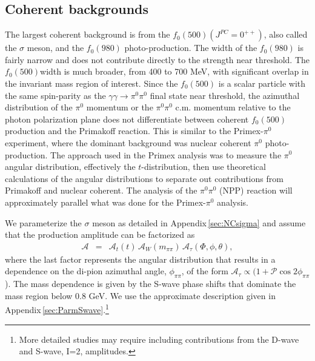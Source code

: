 \subsection{Coherent backgrounds}
   
 The largest coherent background is  
from the $f_0(500)(J^{PC}=0^{++})$, also called the $\sigma$ meson, and the $f_0(980)$ photo-production.  The width of the
$f_0(980)$ is fairly narrow and does not contribute directly to the strength near threshold.
The $f_0(500)$width is much
broader, from 400 to 700 MeV, with significant overlap in the
invariant mass region of interest.  Since the $f_0(500)$ is a scalar
particle with the same spin-parity as the $\gamma \gamma \rightarrow
\pi^0\pi^0$ final state near threshold, the azimuthal distribution of
the $\pi^0$ momentum or the $\pi^0\pi^0$ c.m. momentum relative to the
photon polarization plane does not differentiate between coherent
$f_0(500)$ production and the Primakoff reaction.  
This is similar to the Primex-$\pi^0$ experiment, where the dominant background was
nuclear coherent $\pi^0$ photo-production.  The approach used in the
Primex analysis was to measure the $\pi^0$ angular distribution,
effectively the $t$-distribution, then use theoretical calculations of
the angular distributions to separate out contributions from Primakoff
and nuclear coherent. The analysis of the $\pi^0\pi^0$ (NPP) reaction
will approximately parallel what was done for the Primex-$\pi^0$
analysis.  

We parameterize the $\sigma$ meson as detailed in Appendix\,\ref{sec:NCsigma} and assume that the production amplitude can be factorized as
\begin{eqnarray}
\mathcal{A} & = & \mathcal{A}_t(t) \, \mathcal{A}_W(m_{\pi\pi}) \, \mathcal{A}_\tau(\Phi, \phi, \theta),
\end{eqnarray}
where the last factor represents the angular distribution that results in a 
dependence on the di-pion azimuthal angle, $\phi_{\pi\pi}$, of the form $\mathcal{A}_\tau \propto (1 + \mathcal{P} \cos{2\phi_{\pi\pi}}$). 
The mass dependence is given by the S-wave phase shifts that dominate the mass region below 0.8 GeV. We use the approximate description given in 
Appendix\,\ref{sec:ParmSwave}.\footnote{More detailed studies may require including contributions from the D-wave and S-wave, I=2, amplitudes.} 

